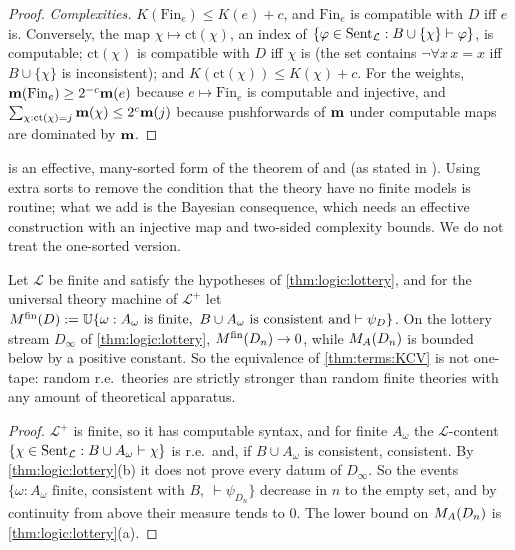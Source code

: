 \begin{proof}
\emph{Complexities.} $K(\mathrm{Fin}_e)\le K(e)+c$, and $\mathrm{Fin}_e$ is compatible with $D$ iff $e$ is. Conversely, the map $\chi\mapsto\mathrm{ct}(\chi)$, an index of $\{\varphi\in\mathrm{Sent}_{\mathcal L}:B\cup\{\chi\}\vdash\varphi\}$, is computable; $\mathrm{ct}(\chi)$ is compatible with $D$ iff $\chi$ is (the set contains $\neg\forall x\,x=x$ iff $B\cup\{\chi\}$ is inconsistent); and $K(\mathrm{ct}(\chi))\le K(\chi)+c$. For the weights, $\mathbf{m}(\mathrm{Fin}_e)\ge2^{-c}\mathbf{m}(e)$ because $e\mapsto\mathrm{Fin}_e$ is computable and injective, and $\sum_{\chi:\mathrm{ct}(\chi)=j}\mathbf{m}(\chi)\le2^c\mathbf{m}(j)$ because pushforwards of $\mathbf{m}$ under computable maps are dominated by $\mathbf{m}$.
\end{proof}

 is an effective, many-sorted form of the theorem of \citet{kleene1952finite} and \citet{craigvaught1958finite} (as stated in \citealp{pakhomov2019question}). Using extra sorts to remove the condition that the theory have no finite models is routine; what we add is the Bayesian consequence, which needs an effective construction with an injective map and two-sided complexity bounds. We do not treat the one-sorted version.

\begin{remark}\label{rem:terms:onetape}
Let $\mathcal L$ be finite and satisfy the hypotheses of \cref{thm:logic:lottery}, and for the universal theory machine of $\mathcal L^+$ let $M^{\rm fin}(D):=\mathbb{U}\{\omega:A_\omega\text{ is finite},\ B\cup A_\omega\text{ is consistent and}\vdash\psi_D\}$. On the lottery stream $D_\infty$ of \cref{thm:logic:lottery}, $M^{\rm fin}(D_n)\to0$, while $M_{A}(D_n)$ is bounded below by a positive constant. So the equivalence of \cref{thm:terms:KCV} is not one-tape: random r.e.\ theories are strictly stronger than random finite theories with any amount of theoretical apparatus.
\end{remark}

\begin{proof}
$\mathcal L^+$ is finite, so it has computable syntax, and for finite $A_\omega$ the $\mathcal L$-content $\{\chi\in\mathrm{Sent}_{\mathcal L}:B\cup A_\omega\vdash\chi\}$ is r.e.\ and, if $B\cup A_\omega$ is consistent, consistent. By \cref{thm:logic:lottery}(b) it does not prove every datum of $D_\infty$. So the events $\{\omega:A_\omega\text{ finite, consistent with }B,\ \vdash\psi_{D_n}\}$ decrease in $n$ to the empty set, and by continuity from above their measure tends to $0$. The lower bound on $M_{A}(D_n)$ is \cref{thm:logic:lottery}(a).
\end{proof}

